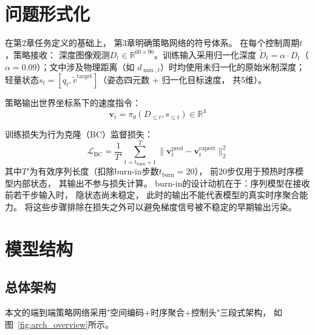 \section{问题形式化}

在第2章任务定义的基础上，
第3章明确策略网络的符号体系。
在每个控制周期$t$，策略接收：
深度图像观测$D_t \in \mathbb{R}^{60 \times 90}$。训练输入采用归一化深度 $\tilde{D}_t = \alpha \cdot D_t$（$\alpha=0.09$）；文中涉及物理距离（如 $d_{\min,t}$）时均使用未归一化的原始米制深度；
轻量状态$s_t = [q_t, \tilde{v}^{\text{target}}]$（姿态四元数 + 归一化目标速度，
共5维）。

策略输出世界坐标系下的速度指令：
\begin{equation}
  \mathbf{v}_t = \pi_\theta(D_{\le t}, s_{\le t}) \in \mathbb{R}^3
\end{equation}

训练损失为行为克隆（BC）监督损失：
\begin{equation}
  \mathcal{L}_{\text{BC}} = \frac{1}{T'} \sum_{t=t_{\text{burn}}+1}^{T} \|\mathbf{v}_t^{\text{pred}} - \mathbf{v}_t^{\text{expert}}\|_2^2
  \label{eq:bc_loss_ch3}
\end{equation}
其中$T'$为有效序列长度（扣除burn-in步数$t_{\text{burn}}=20$），
前20步仅用于预热时序模型内部状态，
其输出不参与损失计算。
burn-in的设计动机在于：序列模型在接收前若干步输入时，
隐状态尚未稳定，
此时的输出不能代表模型的真实时序聚合能力。
将这些步骤排除在损失之外可以避免梯度信号被不稳定的早期输出污染。


\section{模型结构}

\subsection{总体架构}

本文的端到端策略网络采用"空间编码+时序聚合+控制头"三段式架构，
如图~\ref{fig:arch_overview}所示。

